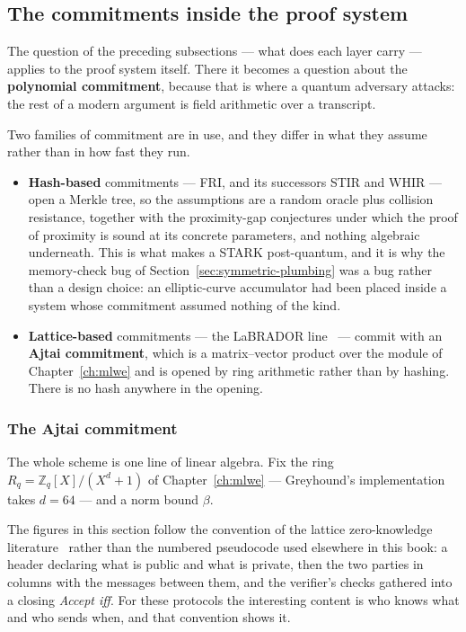 \subsection{The commitments inside the proof system}
\label{sec:pq-proof-systems}
The question of the preceding subsections --- what does each layer carry ---
applies to the proof system itself. There it becomes a question about the
\textbf{polynomial commitment}, because that is where a quantum adversary
attacks: the rest of a modern argument is field arithmetic over a transcript.

Two families of commitment are in use, and they differ in what they assume
rather than in how fast they run.

\begin{itemize}
  \item \textbf{Hash-based} commitments --- FRI, and its successors STIR and
        WHIR --- open a Merkle tree, so the assumptions are a random oracle
        plus collision resistance, together with the proximity-gap conjectures
        under which the proof of proximity is sound at its concrete
        parameters, and nothing algebraic underneath. This is what
        makes a STARK post-quantum, and it is why the memory-check bug of
        Section~\ref{sec:symmetric-plumbing} was a bug rather than a design
        choice: an elliptic-curve accumulator had been placed inside a system
        whose commitment assumed nothing of the kind.
  \item \textbf{Lattice-based} commitments --- the LaBRADOR
        line~\cite{labrador2023} --- commit with an \textbf{Ajtai commitment},
        which is a matrix--vector product over the module of
        Chapter~\ref{ch:mlwe} and is opened by ring arithmetic rather than by
        hashing. There is no hash anywhere in the opening.
\end{itemize}

\subsubsection{The Ajtai commitment}
The whole scheme is one line of linear algebra. Fix the ring
$R_q=\mathbb{Z}_q[X]/(X^d+1)$ of Chapter~\ref{ch:mlwe} --- Greyhound's
implementation takes $d=64$ --- and a norm bound $\beta$.

The figures in this section follow the convention of the lattice zero-knowledge
literature~\cite{lnp2022} rather than the numbered pseudocode used elsewhere in
this book: a header declaring what is public and what is private, then the two
parties in columns with the messages between them, and the verifier's checks
gathered into a closing \emph{Accept iff}. For these protocols the interesting
content is who knows what and who sends when, and that convention shows it.

